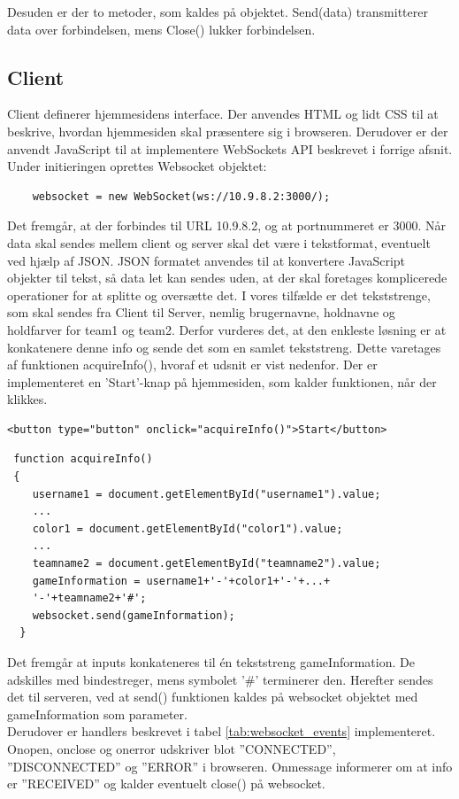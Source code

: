 \documentclass[Softwaredesign/Softwaredesign_main.tex]{subfiles}
\begin{document}
Desuden er der to metoder, som kaldes på objektet. Send(data) transmitterer data over forbindelsen, mens Close() lukker forbindelsen.

\subsection{Client}\label{client_doc}
Client definerer hjemmesidens interface. Der anvendes HTML og lidt CSS til at beskrive, hvordan hjemmesiden skal præsentere sig i browseren. Derudover er der anvendt JavaScript til at implementere WebSockets API beskrevet i forrige afsnit. Under initieringen oprettes Websocket objektet:
\begin{lstlisting}
    websocket = new WebSocket(ws://10.9.8.2:3000/);
\end{lstlisting}
Det fremgår, at der forbindes til URL 10.9.8.2, og at portnummeret er 3000. Når data skal sendes mellem client og server skal det være i tekstformat, eventuelt ved hjælp af JSON.\cite{json_intro} JSON formatet anvendes til at konvertere JavaScript objekter til tekst, så data let kan sendes uden, at der skal foretages komplicerede operationer for at splitte og oversætte det. I vores tilfælde er det tekststrenge, som skal sendes fra Client til Server, nemlig brugernavne, holdnavne og holdfarver for team1 og team2. Derfor vurderes det, at den enkleste løsning er at konkatenere denne info og sende det som en samlet tekststreng. Dette varetages af funktionen acquireInfo(), hvoraf et udsnit er vist nedenfor. Der er implementeret en 'Start'-knap på hjemmesiden, som kalder funktionen, når der klikkes.\\
\begin{lstlisting}
<button type="button" onclick="acquireInfo()">Start</button>
\end{lstlisting}
\begin{lstlisting}
 function acquireInfo()
 {
    username1 = document.getElementById("username1").value;
    ...
    color1 = document.getElementById("color1").value;
    ...
    teamname2 = document.getElementById("teamname2").value;
    gameInformation = username1+'-'+color1+'-'+...+
    '-'+teamname2+'#';
    websocket.send(gameInformation);
  }
\end{lstlisting}
Det fremgår at inputs konkateneres til én tekststreng gameInformation. De adskilles med bindestreger, mens symbolet '\#' terminerer den. Herefter sendes det til serveren, ved at send() funktionen kaldes på websocket objektet med gameInformation som parameter.
\\Derudover er handlers beskrevet i tabel \ref{tab:websocket_events} implementeret. Onopen, onclose og onerror udskriver blot ''CONNECTED'', ''DISCONNECTED'' og ''ERROR'' i browseren. Onmessage informerer om at info er ''RECEIVED'' og kalder eventuelt close() på websocket.
\end{document}

